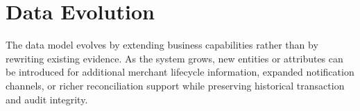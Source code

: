 \section{Data Evolution}

The data model evolves by extending business capabilities rather than by
rewriting existing evidence. As the system grows, new entities or attributes
can be introduced for additional merchant lifecycle information, expanded
notification channels, or richer reconciliation support while preserving
historical transaction and audit integrity.
